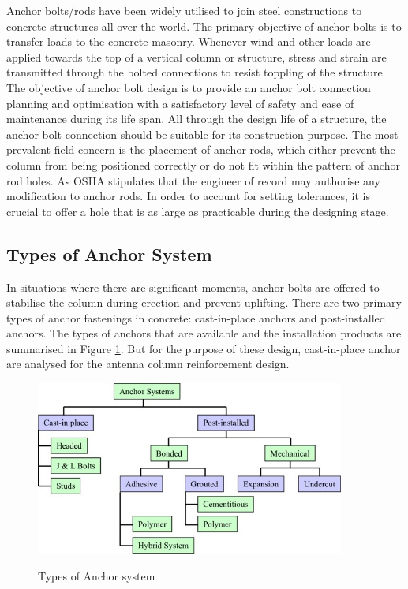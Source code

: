 {Anchor bolts/rods have been widely utilised to join steel constructions to concrete structures all over the world. The primary objective of anchor bolts is to transfer loads to the concrete masonry. Whenever wind and other loads are applied towards the top of a vertical column or structure, stress and strain are transmitted through the bolted connections to resist toppling of the structure.
The objective of anchor bolt design is to provide an anchor bolt connection planning and optimisation with a satisfactory level of safety and ease of maintenance during its life span. All through the design life of a structure, the anchor bolt connection should be suitable for its construction purpose. The most prevalent field concern is the placement of anchor rods, which either prevent the column from being positioned correctly or do not fit within the pattern of anchor rod holes. As OSHA stipulates that the engineer of record may authorise any modification to anchor rods. In order to account for setting tolerances, it is crucial to offer a hole that is as large as practicable during the designing stage.

\subsection{Types of Anchor System}
In situations where there are significant moments, anchor bolts are offered to stabilise the column during erection and prevent uplifting. There are two primary types of anchor fastenings in concrete: cast-in-place anchors and post-installed anchors. The types of anchors that are available and the installation products are summarised in Figure \ref{fig:3.17}. But for the purpose of these design, cast-in-place anchor are analysed for the antenna column reinforcement design.

\begin{figure}[htp]
    \centering
    \includegraphics[width=4in]{Figures/1-Types-Anchor_system .jpg}
    \caption{Types of Anchor system}
    \cite{cook2003design}
    \label{fig:3.17}
\end{figure}
  
}
